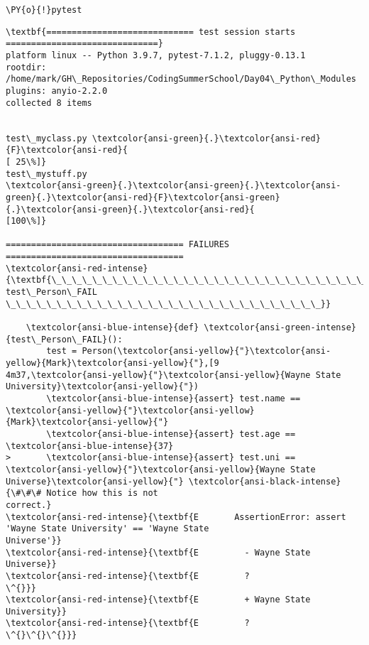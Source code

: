     \begin{tcolorbox}[breakable, size=fbox, boxrule=1pt, pad at break*=1mm,colback=cellbackground, colframe=cellborder]
\begin{Verbatim}[commandchars=\\\{\}]
\PY{o}{!}pytest 
\end{Verbatim}
\end{tcolorbox}

    \begin{Verbatim}[commandchars=\\\{\}]
\textbf{============================= test session starts
==============================}
platform linux -- Python 3.9.7, pytest-7.1.2, pluggy-0.13.1
rootdir: /home/mark/GH\_Repositories/CodingSummerSchool/Day04\_Python\_Modules
plugins: anyio-2.2.0
collected 8 items


test\_myclass.py \textcolor{ansi-green}{.}\textcolor{ansi-red}{F}\textcolor{ansi-red}{
[ 25\%]}
test\_mystuff.py
\textcolor{ansi-green}{.}\textcolor{ansi-green}{.}\textcolor{ansi-green}{.}\textcolor{ansi-red}{F}\textcolor{ansi-green}{.}\textcolor{ansi-green}{.}\textcolor{ansi-red}{
[100\%]}

=================================== FAILURES ===================================
\textcolor{ansi-red-intense}{\textbf{\_\_\_\_\_\_\_\_\_\_\_\_\_\_\_\_\_\_\_\_\_\_\_\_\_\_\_\_\_\_\_ test\_Person\_FAIL
\_\_\_\_\_\_\_\_\_\_\_\_\_\_\_\_\_\_\_\_\_\_\_\_\_\_\_\_\_\_\_}}

    \textcolor{ansi-blue-intense}{def} \textcolor{ansi-green-intense}{test\_Person\_FAIL}():
        test = Person(\textcolor{ansi-yellow}{"}\textcolor{ansi-yellow}{Mark}\textcolor{ansi-yellow}{"},[9
4m37,\textcolor{ansi-yellow}{"}\textcolor{ansi-yellow}{Wayne State
University}\textcolor{ansi-yellow}{"})
        \textcolor{ansi-blue-intense}{assert} test.name ==
\textcolor{ansi-yellow}{"}\textcolor{ansi-yellow}{Mark}\textcolor{ansi-yellow}{"}
        \textcolor{ansi-blue-intense}{assert} test.age == \textcolor{ansi-blue-intense}{37}
>       \textcolor{ansi-blue-intense}{assert} test.uni == \textcolor{ansi-yellow}{"}\textcolor{ansi-yellow}{Wayne State
Universe}\textcolor{ansi-yellow}{"} \textcolor{ansi-black-intense}{\#\#\# Notice how this is not
correct.}
\textcolor{ansi-red-intense}{\textbf{E       AssertionError: assert 'Wayne State University' == 'Wayne State
Universe'}}
\textcolor{ansi-red-intense}{\textbf{E         - Wayne State Universe}}
\textcolor{ansi-red-intense}{\textbf{E         ?                    \^{}}}
\textcolor{ansi-red-intense}{\textbf{E         + Wayne State University}}
\textcolor{ansi-red-intense}{\textbf{E         ?                    \^{}\^{}\^{}}}


\end{Verbatim}
